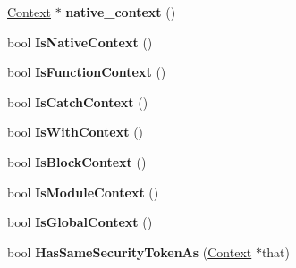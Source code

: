 \begin{DoxyCompactItemize}
\item 
\hypertarget{classv8_1_1internal_1_1_context_a932151f0b9b404bf7731294a0639399b}{}\hyperlink{classv8_1_1internal_1_1_context}{Context} $\ast$ {\bfseries native\+\_\+context} ()\label{classv8_1_1internal_1_1_context_a932151f0b9b404bf7731294a0639399b}

\item 
\hypertarget{classv8_1_1internal_1_1_context_a3c1dc7d83a558bb508f062821821e499}{}bool {\bfseries Is\+Native\+Context} ()\label{classv8_1_1internal_1_1_context_a3c1dc7d83a558bb508f062821821e499}

\item 
\hypertarget{classv8_1_1internal_1_1_context_ad6c48b6346d3914ece1b8a84979bc188}{}bool {\bfseries Is\+Function\+Context} ()\label{classv8_1_1internal_1_1_context_ad6c48b6346d3914ece1b8a84979bc188}

\item 
\hypertarget{classv8_1_1internal_1_1_context_acd9e4ea343c0680ffc6b2edb9724d7e0}{}bool {\bfseries Is\+Catch\+Context} ()\label{classv8_1_1internal_1_1_context_acd9e4ea343c0680ffc6b2edb9724d7e0}

\item 
\hypertarget{classv8_1_1internal_1_1_context_ad2f6f05429ffa28117936bbc818962f3}{}bool {\bfseries Is\+With\+Context} ()\label{classv8_1_1internal_1_1_context_ad2f6f05429ffa28117936bbc818962f3}

\item 
\hypertarget{classv8_1_1internal_1_1_context_a9cd820060e28954fc3f5760b178e37c5}{}bool {\bfseries Is\+Block\+Context} ()\label{classv8_1_1internal_1_1_context_a9cd820060e28954fc3f5760b178e37c5}

\item 
\hypertarget{classv8_1_1internal_1_1_context_a39d217bf4164d61ce611540e7ad8bce3}{}bool {\bfseries Is\+Module\+Context} ()\label{classv8_1_1internal_1_1_context_a39d217bf4164d61ce611540e7ad8bce3}

\item 
\hypertarget{classv8_1_1internal_1_1_context_a13077fe296efb14c13171ab620a17cb8}{}bool {\bfseries Is\+Global\+Context} ()\label{classv8_1_1internal_1_1_context_a13077fe296efb14c13171ab620a17cb8}

\item 
\hypertarget{classv8_1_1internal_1_1_context_ac51c33cefa50030e4346ce03d844e0b8}{}bool {\bfseries Has\+Same\+Security\+Token\+As} (\hyperlink{classv8_1_1internal_1_1_context}{Context} $\ast$that)\label{classv8_1_1internal_1_1_context_ac51c33cefa50030e4346ce03d844e0b8}


\end{DoxyCompactItemize}
